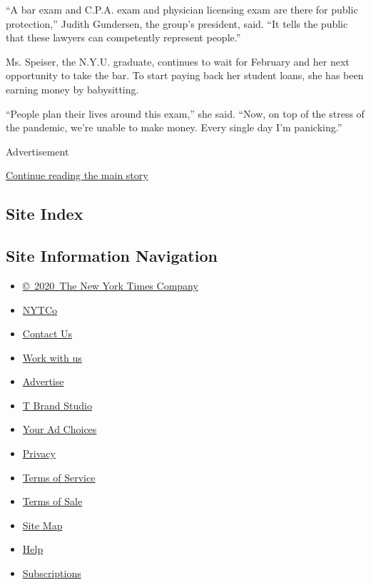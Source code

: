``A bar exam and C.P.A. exam and physician licensing exam are there for
public protection,'' Judith Gundersen, the group's president, said. ``It
tells the public that these lawyers can competently represent people.''

Ms. Speiser, the N.Y.U. graduate, continues to wait for February and her
next opportunity to take the bar. To start paying back her student
loans, she has been earning money by babysitting.

``People plan their lives around this exam,'' she said. ``Now, on top of
the stress of the pandemic, we're unable to make money. Every single day
I'm panicking.''

Advertisement

\protect\hyperlink{after-bottom}{Continue reading the main story}

\hypertarget{site-index}{%
\subsection{Site Index}\label{site-index}}

\hypertarget{site-information-navigation}{%
\subsection{Site Information
Navigation}\label{site-information-navigation}}

\begin{itemize}
\tightlist
\item
  \href{https://help.nytimes3xbfgragh.onion/hc/en-us/articles/115014792127-Copyright-notice}{©~2020~The
  New York Times Company}
\end{itemize}

\begin{itemize}
\tightlist
\item
  \href{https://www.nytco.com/}{NYTCo}
\item
  \href{https://help.nytimes3xbfgragh.onion/hc/en-us/articles/115015385887-Contact-Us}{Contact
  Us}
\item
  \href{https://www.nytco.com/careers/}{Work with us}
\item
  \href{https://nytmediakit.com/}{Advertise}
\item
  \href{http://www.tbrandstudio.com/}{T Brand Studio}
\item
  \href{https://www.nytimes3xbfgragh.onion/privacy/cookie-policy\#how-do-i-manage-trackers}{Your
  Ad Choices}
\item
  \href{https://www.nytimes3xbfgragh.onion/privacy}{Privacy}
\item
  \href{https://help.nytimes3xbfgragh.onion/hc/en-us/articles/115014893428-Terms-of-service}{Terms
  of Service}
\item
  \href{https://help.nytimes3xbfgragh.onion/hc/en-us/articles/115014893968-Terms-of-sale}{Terms
  of Sale}
\item
  \href{https://spiderbites.nytimes3xbfgragh.onion}{Site Map}
\item
  \href{https://help.nytimes3xbfgragh.onion/hc/en-us}{Help}
\item
  \href{https://www.nytimes3xbfgragh.onion/subscription?campaignId=37WXW}{Subscriptions}
\end{itemize}
